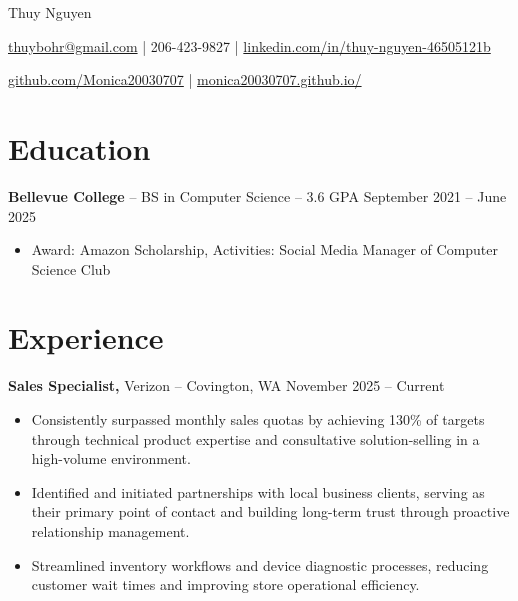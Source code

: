 \documentclass[11pt]{article}       %
\begin{document}
\centerline{\Huge Thuy Nguyen}

\vspace{5pt}

\centerline{\href{mailto:thuybohr@gmail.com}{thuybohr@gmail.com} | 206-423-9827 |
\href{https://www.linkedin.com/in/thuy-nguyen-46505121b/}{linkedin.com/in/thuy-nguyen-46505121b}}

\centerline{\href{https://github.com/Monica20030707}{github.com/Monica20030707} | 
\href{https://monica20030707.github.io/}{monica20030707.github.io/}} 

\vspace{-9pt}

\section*{Education}
\textbf{Bellevue College} -- BS in Computer Science -- 3.6 GPA \hfill September 2021 -- June 2025\\
\vspace{-9pt}
\begin{itemize}
  \item Award: Amazon Scholarship, Activities: Social Media Manager of Computer Science Club
\end{itemize}

\vspace{-18.5pt}

\section*{Experience}

\textbf{Sales Specialist,} {Verizon} -- Covington, WA \hfill November 2025 -- Current \\
\vspace{-9pt}
\begin{itemize}
  \item Consistently surpassed monthly sales quotas by achieving 130\% of targets through technical product expertise and consultative solution-selling in a high-volume environment.
  \item Identified and initiated partnerships with local business clients, serving as their primary point of contact and building long-term trust through proactive relationship management.
  \item Streamlined inventory workflows and device diagnostic processes, reducing customer wait times and improving store operational efficiency.
\end{itemize}
\end{document}
